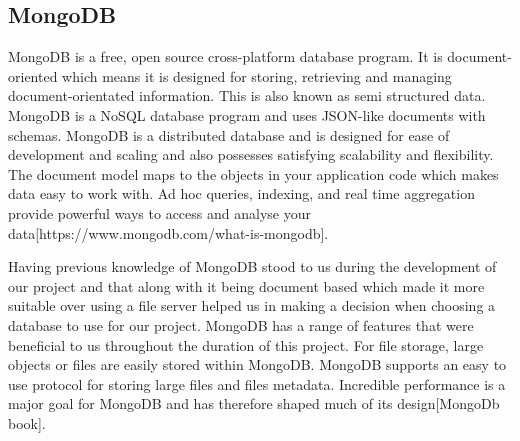 \subsection{MongoDB}
MongoDB is a free, open source cross-platform database program. It is document-oriented which means it is designed for storing, retrieving and managing document-orientated information. This is also known as semi structured data. MongoDB is a NoSQL database program and uses JSON-like documents with schemas. MongoDB is a distributed database and is designed for ease of development and scaling and also possesses satisfying scalability and flexibility. The document model maps to the objects in your application code which makes data easy to work with. Ad hoc queries, indexing, and real time aggregation provide powerful ways to access and analyse your data[https://www.mongodb.com/what-is-mongodb]. \par Having previous knowledge of MongoDB stood to us during the development of our project and that along with it being document based which made it more suitable over using a file server helped us in making a decision when choosing a database to use for our project. MongoDB has a range of features that were beneficial to us throughout the duration of this project. For file storage, large objects or files are easily stored within MongoDB. MongoDB supports an easy to use protocol for storing large files and files metadata. Incredible performance is a major goal for MongoDB and has therefore shaped much of its design[MongoDb book].

